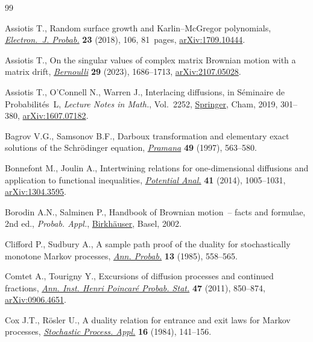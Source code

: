 \begin{thebibliography}{99}
\footnotesize\itemsep=0pt

Assiotis T., Random surface growth and {K}arlin--{M}c{G}regor polynomials,
 \href{https://doi.org/10.1214/18-ejp236}{\textit{Electron.~J. Probab.}}
 \textbf{23} (2018), 106, 81~pages,
 \href{http://arxiv.org/abs/1709.10444}{arXiv:1709.10444}.

Assiotis T., On the singular values of complex matrix {B}rownian motion with a
 matrix drift, \href{https://doi.org/10.3150/22-bej1517}{\textit{Bernoulli}}
 \textbf{29} (2023), 1686--1713,
 \href{http://arxiv.org/abs/2107.05028}{arXiv:2107.05028}.

Assiotis T., O'Connell N., Warren J., Interlacing diffusions, in S\'eminaire de
 {P}robabilit\'es~{L}, \textit{Lecture Notes in Math.}, Vol.~2252,
 \href{https://doi.org/10.1007/978-3-030-28535-7_13}{Springer}, Cham, 2019,
 301--380, \href{http://arxiv.org/abs/1607.07182}{arXiv:1607.07182}.

Bagrov V.G., Samsonov B.F., Darboux transformation and elementary exact
 solutions of the {S}chr\"odinger equation,
 \href{https://doi.org/10.1007/BF02848330}{\textit{Pramana}} \textbf{49}
 (1997), 563--580.

Bonnefont M., Joulin A., Intertwining relations for one-dimensional diffusions
 and application to functional inequalities,
 \href{https://doi.org/10.1007/s11118-014-9408-7}{\textit{Potential Anal.}}
 \textbf{41} (2014), 1005--1031,
 \href{http://arxiv.org/abs/1304.3595}{arXiv:1304.3595}.

Borodin A.N., Salminen P., Handbook of {B}rownian motion~-- facts and formulae,
 2nd ed., \textit{Probab. Appl.},
 \href{https://doi.org/10.1007/978-3-0348-8163-0}{Birkh\"auser}, Basel, 2002.

Clifford P., Sudbury A., A sample path proof of the duality for stochastically
 monotone {M}arkov processes,
 \href{https://doi.org/10.1214/aop/1176993008}{\textit{Ann. Probab.}}
 \textbf{13} (1985), 558--565.

Comtet A., Tourigny Y., Excursions of diffusion processes and continued
 fractions, \href{https://doi.org/10.1214/10-AIHP390}{\textit{Ann. Inst. Henri
 Poincar\'e Probab. Stat.}} \textbf{47} (2011), 850--874,
 \href{http://arxiv.org/abs/0906.4651}{arXiv:0906.4651}.

Cox J.T., R\"osler U., A duality relation for entrance and exit laws for
 {M}arkov processes,
 \href{https://doi.org/10.1016/0304-4149(84)90015-2}{\textit{Stochastic
 Process. Appl.}} \textbf{16} (1984), 141--156.


\end{thebibliography}
